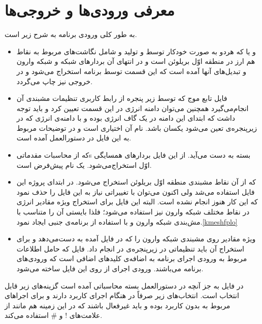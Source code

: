 \section{معرفی ورودی‌ها و خروجی‌ها}\label{seq:4.3}
به طور کلی ورودی برنامه  به شرح زیر است.
\begin{itemize}
 \item{}و یا 
 که هردو به صورت خودکار توسط 
 و
  تولید و شامل نگاشت‌های مربوط به نقاط هم ارز در منطقه اوّل بریلوئن است و در انتهای 
آن بردارهای شبکه و شبکه وارون و تبدیل‌های آنها آمده است که این قسمت توسط برنامه   
استخراج‌ می‌شود و در خروجی نیز چاپ می‌گردد.
 \item
 فایل تابع موج که توسط زیر پنجره  از رابط کاربری  تنظیمات مشبندی آن انجام‌می‌گیرد 
همچنین می‌توان دامنه انرژی در این قسمت تعیین کرد و باید توجه داشت که ابتدای این دامنه در یک گاف انرژی 
بوده و با دامنه‌ی انرژی که در زیرپنجره‌ی  تعین می‌شود یکسان باشد. نام آن اختیاری است و در 
توضیحات مربوط به این فایل در دستورالعمل  آمده است.\cite{Koepernik2009}
 \item{}
 که از \glspl{محاسبات مقدماتی} بسته   به دست می‌آید. از این فایل بردارهای همسایگی اوّل استخراج‌می‌شود.  یک نام پیش‌فرض است.
 \item{}
 که از آن نقاط مشبندی منطقه اوّل بریلوئن استخراج ‌می‌شود. در ابتدای پروژه این فایل استفاده ‌می‌شد ولی اکنون می‌توان با تغییراتی نیاز به این فایل را حذف نمود که 
این کار هنوز انجام نشده است. البته این فایل برای استخراج ویژه مقادیر انرژی در نقاط مختلف شبکه وارون نیز استفاده می‌شود؛ فلذا بایستی آن را متناسب با مش‌بندی 
شبکه وارون و با استفاده از برنامه‌ی جنبی  ایجاد نمود.\ref{kmeshfplo}
 \item{}
ویژه مقادیر روی مشبندی شبکه وارون را که در فایل  آمده به دست‌می‌دهد و برای استخراج آن باید تنظیماتی در زیرپنجره‌ی  در  
انجام داد.
 فایل  که حامل اطلاعات مربوط به ورودی اجرای برنامه  به اضافه‌ی کلیدهای اضافی است که ورودی‌های برنامه  می‌باشند. ورودی  اجرای  از روی این فایل ساخته می‌شود.
\end{itemize}
در فایل  به جز آنچه در دستورالعمل بسته محاسباتی  آمده است گزینه‌های زیر قابل انتخاب است.\cite{Wannier902013} انتخاب‌های زیر صرفاً در هنگام اجرای  کاربرد دارند و برای اجراهای مربوط به  بدون کاربرد بوده و باید غیرفعال باشند که در این زمینه  هم مانند  از علامت‌های ! و \# استفاده می‌کند.
